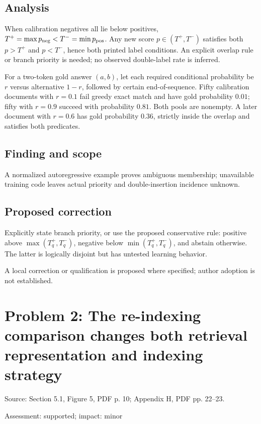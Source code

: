 \documentclass[11pt]{article}
\begin{document}
\subsection*{Analysis}

When calibration negatives all lie below positives, \(T^+=\max p_{\rm neg}<T^-=\min p_{\rm pos}\). Any new score \(p\in(T^+,T^-)\) satisfies both \(p>T^+\) and \(p<T^-\), hence both printed label conditions. An explicit overlap rule or branch priority is needed; no observed double-label rate is inferred.

For a two-token gold answer \((a,b)\), let each required conditional probability be \(r\) versus alternative \(1-r\), followed by certain end-of-sequence. Fifty calibration documents with \(r=0.1\) fail greedy exact match and have gold probability \(0.01\); fifty with \(r=0.9\) succeed with probability \(0.81\). Both pools are nonempty. A later document with \(r=0.6\) has gold probability \(0.36\), strictly inside the overlap and satisfies both predicates.

\subsection*{Finding and scope}

A normalized autoregressive example proves ambiguous membership; unavailable training code leaves actual priority and double-insertion incidence unknown.

\subsection*{Proposed correction}

Explicitly state branch priority, or use the proposed conservative rule: positive above \(\max(T_q^+,T_q^-)\), negative below \(\min(T_q^+,T_q^-)\), and abstain otherwise. The latter is logically disjoint but has untested learning behavior.

A local correction or qualification is proposed where specified; author adoption is not established.

\section*{Problem 2: The re-indexing comparison changes both retrieval representation and indexing strategy}

Source: Section 5.1, Figure 5, PDF p. 10; Appendix H, PDF pp. 22–23.

Assessment: supported; impact: minor
\end{document}
